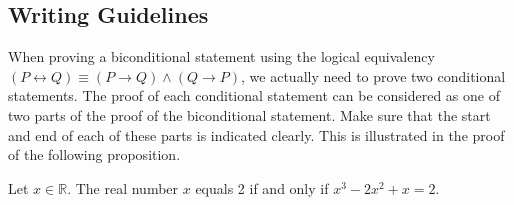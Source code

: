 \subsection*{Writing Guidelines} %
When proving a biconditional statement using the logical equivalency \linebreak
$\left( {P \leftrightarrow Q} \right) \equiv \left( {P \to Q} \right) \wedge \left( {Q \to P} \right)$,  we actually need to prove two conditional statements.  The proof of each conditional statement can be considered as one of two parts of the proof of the biconditional statement.  Make sure that the start and end of each of these parts is indicated clearly.  This is illustrated in the proof of the following proposition.
%
\begin{proposition}\label{P:iffexample}
Let  $x \in \mathbb{R}$.  The real number  $x$  equals  2  if and only if  
\linebreak
$x^3  - 2x^2  + x = 2$.
\end{proposition}
%
